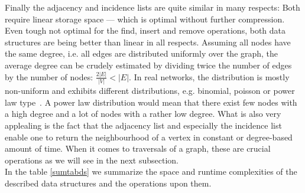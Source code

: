         Finally the adjacency and incidence lists are quite similar in many respects: Both require linear storage space --- which is optimal without further compression. 
        Even tough not optimal for  the find, insert and remove operations, both data structures are being better than linear in all respects. 
        Assuming all nodes have the same degree, i.e. all edges are distributed uniformly over the graph, the average degree can be crudely estimated by dividing twice the number of edges by the number of nodes: $\frac{2|E|}{|V|} < |E|$.
        In real networks, the distribution is mostly non-uniform and exhibits different distributions, e.g. binomial, poisson or power law type~\autocite{holme2019rare}. 
        A power law distribution would mean that there exist few nodes with a high degree and a lot of nodes with a rather low degree. 
        What is also very applealing is the fact that the adjacency list and especially the incidence list enable one to return the neighbourhood of a vertex in constant or degree-based amount of time. 
        When it comes to traversals of a graph, these are crucial operations as we will see in the next subsection. \\
        
        In the table \ref{sumtabds} we summarize the space and runtime complexities of the described data structures and the operations upon them. 
                

